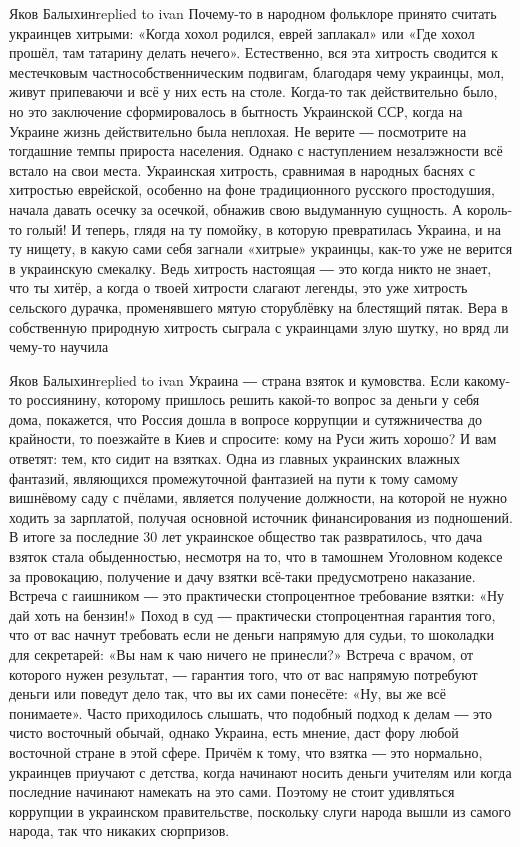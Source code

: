 Яков Балыхинreplied to ivan
Почему-то в народном фольклоре принято считать украинцев хитрыми: «Когда хохол родился, еврей заплакал» или «Где хохол прошёл, там татарину делать нечего». Естественно, вся эта хитрость сводится к местечковым частнособственническим подвигам, благодаря чему украинцы, мол, живут припеваючи и всё у них есть на столе. Когда-то так действительно было, но это заключение сформировалось в бытность Украинской ССР, когда на Украине жизнь действительно была неплохая. Не верите ― посмотрите на тогдашние темпы прироста населения. Однако с наступлением незалэжности всё встало на свои места. Украинская хитрость, сравнимая в народных баснях с хитростью еврейской, особенно на фоне традиционного русского простодушия, начала давать осечку за осечкой, обнажив свою выдуманную сущность. А король-то голый! И теперь, глядя на ту помойку, в которую превратилась Украина, и на ту нищету, в какую сами себя загнали «хитрые» украинцы, как-то уже не верится в украинскую смекалку. Ведь хитрость настоящая ― это когда никто не знает, что ты хитёр, а когда о твоей хитрости слагают легенды, это уже хитрость сельского дурачка, променявшего мятую сторублёвку на блестящий пятак. Вера в собственную природную хитрость сыграла с украинцами злую шутку, но вряд ли чему-то научила

Яков Балыхинreplied to ivan
Украина ― страна взяток и кумовства. Если какому-то россиянину, которому пришлось решить какой-то вопрос за деньги у себя дома, покажется, что Россия дошла в вопросе коррупции и сутяжничества до крайности, то поезжайте в Киев и спросите: кому на Руси жить хорошо? И вам ответят: тем, кто сидит на взятках. Одна из главных украинских влажных фантазий, являющихся промежуточной фантазией на пути к тому самому вишнёвому саду с пчёлами, является получение должности, на которой не нужно ходить за зарплатой, получая основной источник финансирования из подношений. В итоге за последние 30 лет украинское общество так развратилось, что дача взяток стала обыденностью, несмотря на то, что в тамошнем Уголовном кодексе за провокацию, получение и дачу взятки всё-таки предусмотрено наказание. Встреча с гаишником ― это практически стопроцентное требование взятки: «Ну дай хоть на бензин!» Поход в суд ― практически стопроцентная гарантия того, что от вас начнут требовать если не деньги напрямую для судьи, то шоколадки для секретарей: «Вы нам к чаю ничего не принесли?» Встреча с врачом, от которого нужен результат, ― гарантия того, что от вас напрямую потребуют деньги или поведут дело так, что вы их сами понесёте: «Ну, вы же всё понимаете». Часто приходилось слышать, что подобный подход к делам ― это чисто восточный обычай, однако Украина, есть мнение, даст фору любой восточной стране в этой сфере. Причём к тому, что взятка ― это нормально, украинцев приучают с детства, когда начинают носить деньги учителям или когда последние начинают намекать на это сами. Поэтому не стоит удивляться коррупции в украинском правительстве, поскольку слуги народа вышли из самого народа, так что никаких сюрпризов.


